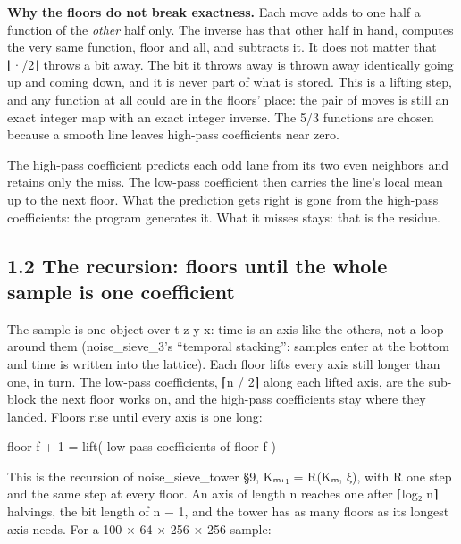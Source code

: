\textbf{Why the floors do not break exactness.} Each move adds to one half a function of the \emph{other} half only. The inverse has that other half in hand, computes the very same function, floor and all, and subtracts it. It does not matter that ⌊·/2⌋ throws a bit away. The bit it throws away is thrown away identically going up and coming down, and it is never part of what is stored. This is a lifting step, and any function at all could are in the floors' place: the pair of moves is still an exact integer map with an exact integer inverse. The 5/3 functions are chosen because a smooth line leaves high-pass coefficients near zero.

The high-pass coefficient predicts each odd lane from its two even neighbors and retains only the miss. The low-pass coefficient then carries the line's local mean up to the next floor. What the prediction gets right is gone from the high-pass coefficients: the program generates it. What it misses stays: that is the residue.

\subsection{\texorpdfstring{1.2 The recursion: floors until the whole sample is one coefficient}{1.2 The recursion: floors until the whole sample is one coefficient}}

The sample is one object over t z y x: time is an axis like the others, not a loop around them (noise\_\allowbreak{}sieve\_\allowbreak{}3's “temporal stacking”: samples enter at the bottom and time is written into the lattice). Each floor lifts every axis still longer than one, in turn. The low-pass coefficients, ⌈n / 2⌉ along each lifted axis, are the sub-block the next floor works on, and the high-pass coefficients stay where they landed. Floors rise until every axis is one long:

floor f + 1  =  lift( low-pass coefficients of floor f )

This is the recursion of noise\_\allowbreak{}sieve\_\allowbreak{}tower §9, Kₘ₊₁ = R(Kₘ, ξ), with R one step and the same step at every floor. An axis of length n reaches one after ⌈log₂ n⌉ halvings, the bit length of n − 1, and the tower has as many floors as its longest axis needs. For a 100 × 64 × 256 × 256 sample:

